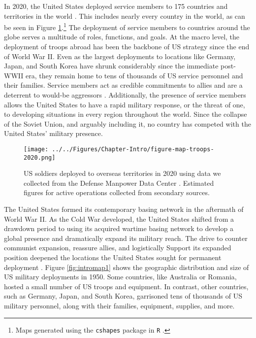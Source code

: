 
In 2020, the United States deployed service members to 175 countries and territories in the world \cite{DMDC2020}. This includes nearly every country in the world, as can be seen in Figure \ref{fig:intromap2}.\footnote{Maps generated using the {\tt cshapes} package in {\tt R} \cite{weidmannetal2010}.}  The deployment of service members to countries around the globe serves a multitude of roles, functions, and goals. At the macro level, the deployment of troops abroad has been the backbone of US strategy since the end of World War II. Even as the largest deployments to locations like Germany, Japan, and South Korea have shrunk considerably since the immediate post-WWII era, they remain home to tens of thousands of US service personnel and their families. Service members act as credible commitments to allies and are a deterrent to would-be aggressors \cite{Schelling1966}. Additionally, the presence of service members allows the United States to have a rapid military response, or the threat of one, to developing situations in every region throughout the world.  Since the collapse of the Soviet Union, and arguably including it, no country has competed with the United States' military presence.


\begin{figure}[t]
	\centering\texttt{[image: ../../Figures/Chapter-Intro/figure-map-troops-2020.png]}
	\caption{US soldiers deployed to overseas territories in 2020 using data we collected from the Defense Manpower Data Center \cite{DMDC2020}. Estimated figures for active operations collected from secondary sources.}
	\label{fig:intromap2}
\end{figure}



The United States formed its contemporary basing network in the aftermath of World War II. As the Cold War developed, the United States shifted from a drawdown period to using its acquired wartime basing network to develop a global presence and dramatically expand its military reach. The drive to counter communist expansion, reassure allies, and logistically Support its expanded position deepened the locations the United States sought for permanent deployment \cite{Huston1988}. Figure \ref{fig:intromap1} shows the geographic distribution and size of US military deployments in 1950. Some countries, like Australia or Romania, hosted a small number of US troops and equipment. In contrast, other countries, such as Germany, Japan, and South Korea, garrisoned tens of thousands of US military personnel, along with their families, equipment, supplies, and more. 


